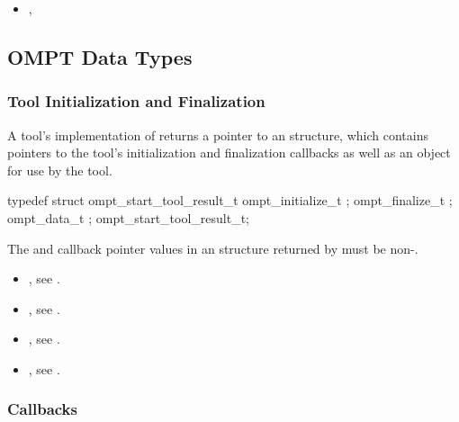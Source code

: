 \crossreferences
\begin{itemize}
\item {}, 
\end{itemize}

\subsection{OMPT Data Types}
\label{sec:ompt-data-types}

\subsubsection{Tool Initialization and Finalization}
\label{sec:ompt_start_tool_result_t}

\summary
A tool's implementation of  returns a pointer to an
 structure, which
contains pointers to the tool's
initialization and finalization callbacks as well as an
 object for use by the tool.


\begin{ccppspecific}
\begin{omptOther}
typedef struct ompt_start_tool_result_t {
  ompt_initialize_t ;
  ompt_finalize_t ;
  ompt_data_t ;
} ompt_start_tool_result_t;
\end{omptOther}
\end{ccppspecific}


\restrictions

The  and  callback pointer values in an
 structure returned by  must be
non-.

\crossreferences
\begin{itemize}
\item {}, see .
\item {}, see .
\item {}, see .
\item {}, see .
\end{itemize}

\subsubsection{Callbacks}
\label{sec:ompt_callbacks_t}

